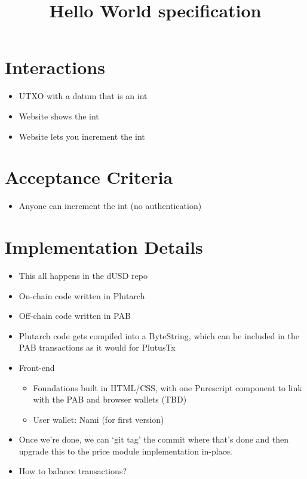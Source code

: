 \documentclass{article}
\title{Hello World specification}
\begin{document}
\maketitle

\section{Interactions}

\begin{itemize}
  \item UTXO with a datum that is an int
  \item Website shows the int
  \item Website lets you increment the int
\end{itemize}

\section{Acceptance Criteria}

\begin{itemize}
  \item Anyone can increment the int (no authentication)
\end{itemize}

\section{Implementation Details}

\begin{itemize}
  \item This all happens in the dUSD repo
  \item On-chain code written in Plutarch
  \item Off-chain code written in PAB
  \item Plutarch code gets compiled into a ByteString, which can be included in
    the PAB transactions as it would for PlutusTx
  \item Front-end
  \begin{itemize}
    \item Foundations built in HTML/CSS, with one Purescript component to link
      with the PAB and browser wallets (TBD)
    \item User wallet: Nami (for first version)
  \end{itemize}
  \item Once we’re done, we can `git tag' the commit where that’s done and then
    upgrade this to the price module implementation in-place.
  \item How to balance transactions?
\end{itemize}
\end{document}
